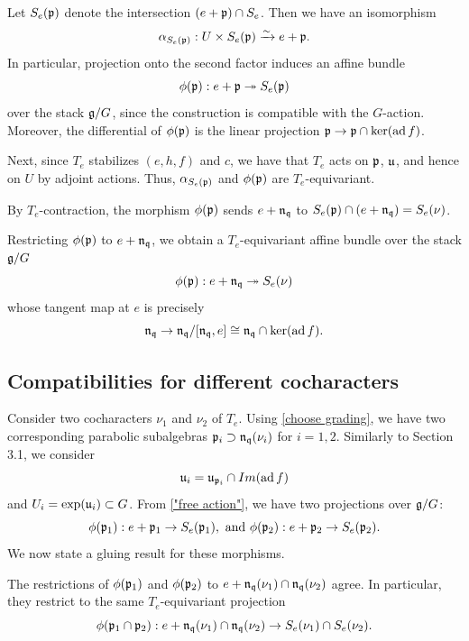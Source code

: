 \documentclass[11pt]{article}
\numberwithin{equation}{section}
\begin{document}
\begin{cor}\label{"free action"}
Let $S_e(\mathfrak{p})$ denote the intersection $(e+\mathfrak{p})\cap S_e$.
Then we have an isomorphism
\[
\alpha_{S_e(\mathfrak{p})}: U\times S_e(\mathfrak{p})\xrightarrow{\sim} e+\mathfrak{p}.
\]
In particular, projection onto the second factor induces an affine bundle
\[
\phi(\mathfrak{p}): e+\mathfrak{p} \twoheadrightarrow S_e(\mathfrak{p})
\]
over the stack $\mathfrak{g}/G$, since the construction is compatible with
the $G$-action.
Moreover, the differential of $\phi(\mathfrak{p})$ is the linear projection
$\mathfrak{p} \to \mathfrak{p} \cap \ker(\operatorname{ad} f)$.
\end{cor}
Next, since $T_e$ stabilizes $(e,h,f)$ and $c$, we have that $T_e$ acts on $\mathfrak{p}$, $\mathfrak{u}$, and hence on $U$ by adjoint actions. Thus, $\alpha_{S_e(\mathfrak{p})}$ and $\phi(\mathfrak{p})$ are $T_e$-equivariant.

By $T_e$-contraction, the morphism $\phi(\mathfrak{p})$ sends $e+\mathfrak{n}_{\mathfrak{q}}$ to $S_e(\mathfrak{p})\cap (e+\mathfrak{n}_{\mathfrak{q}})= S_e(\nu)$.
\begin{cor} \label{projection over stack}
Restricting $\phi(\mathfrak{p})$ to $e+\mathfrak{n}_{\mathfrak{q}}$, we obtain a $T_e$-equivariant affine bundle over the stack $\mathfrak{g}/G$
$$\phi(\mathfrak{p}): e+\mathfrak{n}_{\mathfrak{q}} \twoheadrightarrow S_e(\nu)$$
whose tangent map at $e$ is precisely $$\mathfrak{n}_{\mathfrak{q}} \to \mathfrak{n}_{\mathfrak{q}}/[\mathfrak{n}_{\mathfrak{q}},e]\cong \mathfrak{n}_{\mathfrak{q}}\cap \ker(\operatorname{ad} f).$$
\end{cor}

\subsection{Compatibilities for different cocharacters}
Consider two cocharacters $\nu_1$ and $\nu_2$ of $T_e$. Using \cref{choose grading}, we have two corresponding parabolic subalgebras $\mathfrak{p}_i\supset \mathfrak{n}_{\mathfrak{q}}(\nu_i)$ for $i=1,2$. Similarly to Section 3.1, we consider $$\mathfrak{u}_i= \mathfrak{u}_{\mathfrak{p}_i}\cap Im(\operatorname{ad} f)$$ and $U_i= \exp(\mathfrak{u}_i)\subset G$. 
From \cref{"free action"}, we have two projections over $\mathfrak{g}/G$:
$$\phi(\mathfrak{p}_1): e+ \mathfrak{p}_1\to S_e(\mathfrak{p}_1), \text{   and   } \phi(\mathfrak{p}_2): e+ \mathfrak{p}_2\to S_e(\mathfrak{p}_2).$$
We now state a gluing result for these morphisms.
\begin{pro} \label{gluing}
    The restrictions of $\phi(\mathfrak{p}_1)$ and $\phi(\mathfrak{p}_2)$ to $e+ \mathfrak{n}_{\mathfrak{q}}(\nu_1)\cap \mathfrak{n}_{\mathfrak{q}}(\nu_2)$ agree. In particular, they restrict to the same $T_e$-equivariant projection
    $$\phi(\mathfrak{p}_1\cap \mathfrak{p}_2): e+ \mathfrak{n}_{\mathfrak{q}}(\nu_1)\cap \mathfrak{n}_{\mathfrak{q}}(\nu_2) \to {S}_e(\nu_1)\cap {S}_e(\nu_2).$$    
\end{pro}
\end{document}
